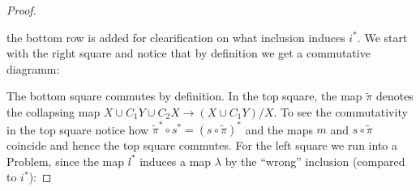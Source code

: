 \begin{proof}
\begin{center}
	\end{center} the bottom row is added for clearification on what inclusion induces $i^*$. We start with the right square and notice that by definition we get a commutative diagramm:
	\begin{center}
	\end{center}
	The bottom square commutes by definition. In the top square, the map $\tilde{\pi}$ denotes the collapsing map $X\cup C_1Y\cup C_2X\to (X\cup C_1Y)\big/X$. To see the commutativity in the top square notice how $\tilde{\pi}^*\circ s^*=(s\circ \tilde{\pi})^*$ and the maps $m$ and $s\circ \tilde{\pi}$ coincide and hence the top square commutes. For the left square we run into a Problem, since the map $l^*$ induces a map $\lambda$ by the “wrong” inclusion (compared to $i^*$):

\end{proof}
